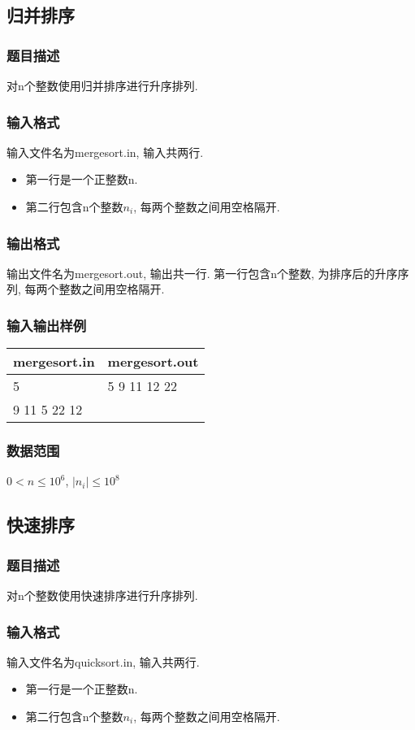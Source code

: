 \subsection{归并排序}
\subsubsection{题目描述}
对n个整数使用归并排序进行升序排列.
\subsubsection{输入格式}
输入文件名为mergesort.in, 输入共两行.
\begin{itemize}
	\item 第一行是一个正整数n.
	\item 第二行包含n个整数$n_i$, 每两个整数之间用空格隔开.
\end{itemize}
\subsubsection{输出格式}
输出文件名为mergesort.out, 输出共一行.
第一行包含n个整数, 为排序后的升序序列, 每两个整数之间用空格隔开.
\subsubsection{输入输出样例}
\label{sec:iosample}
\begin{table}[h!]
	\centering
	\begin{tabular}{|l|l|}
		\hline
		mergesort.in & mergesort.out \\
		\hline
		5            & 5 9 11 12 22  \\
		9 11 5 22 12 & ~             \\
		\hline
	\end{tabular}
\end{table}
\subsubsection{数据范围}
$ 0 < n \leq 10^6 $,
$ | n_i | \leq 10^8 $

\subsection{快速排序}
\subsubsection{题目描述}
对n个整数使用快速排序进行升序排列.
\subsubsection{输入格式}
输入文件名为quicksort.in, 输入共两行.
\begin{itemize}
	\item 第一行是一个正整数n.
	\item 第二行包含n个整数$n_i$, 每两个整数之间用空格隔开.
\end{itemize}
